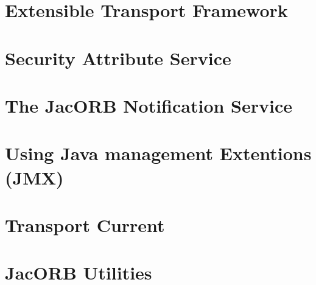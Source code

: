 \documentclass[12pt]{scrbook}
\begin{document}

\chapter{Extensible Transport Framework}
\label{ch:etf}




\chapter{Security Attribute Service}
\label{ch:sas}




\chapter{The JacORB Notification Service}
\label{ch:ntfy}




\chapter{Using Java management Extentions (JMX)}
\label{ch:jmx}






\chapter{Transport Current}
\label{ch:transportcurrent}






\chapter{JacORB Utilities}
\label{ch:tools}
\end{document}
